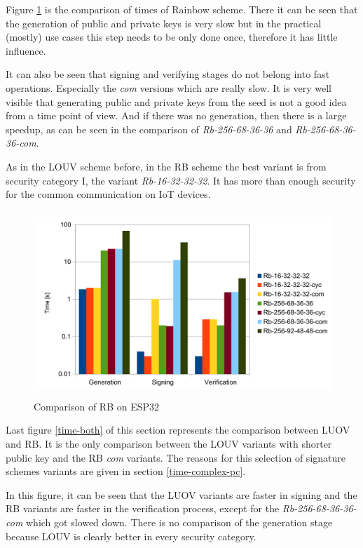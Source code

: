 \documentclass[thesis=M,english]{FITthesis}[2019/12/23]
\begin{document}
\noindent
Figure \ref{time-rb} is the comparison of times of Rainbow scheme. There it can be seen that the generation of public and private keys is very slow but in the practical (mostly) use cases this step needs to be only done once, therefore it has little influence. 

\bigskip
\noindent
It can also be seen that signing and verifying stages do not belong into fast operations. Especially the \textit{com} versions which are really slow. It is very well visible that generating public and private keys from the seed is not a good idea from a time point of view. And if there was no generation, then there is  a large speedup, as can be seen in the comparison of \textit{Rb-256-68-36-36} and \textit{Rb-256-68-36-36-com}.

\bigskip
\noindent
As in the LOUV scheme before, in the RB scheme the best variant is from security category I, the variant \textit{Rb-16-32-32-32}. It has more than enough security for the common communication on IoT devices. 

\begin{figure}[H]
\centering
\includegraphics[width=13cm,height=7cm]{images/time-rb.pdf}
\caption{Comparison of RB on ESP32}
\label{time-rb}
\end{figure}

\noindent
Last figure \ref{time-both} of this section represents the comparison between LUOV and RB. It is the only comparison between the LOUV variants with shorter public key and the RB \textit{com} variants. The reasons for this selection of signature schemes variants are given in section \ref{time-complex-pc}.

\bigskip
\noindent
In this figure, it can be seen that the LUOV variants are faster in signing and the RB variants are faster in the verification process, except for the \textit{Rb-256-68-36-36-com} which got slowed down. There is no comparison of the generation stage because LOUV is clearly better in every security category. 
\end{document}
